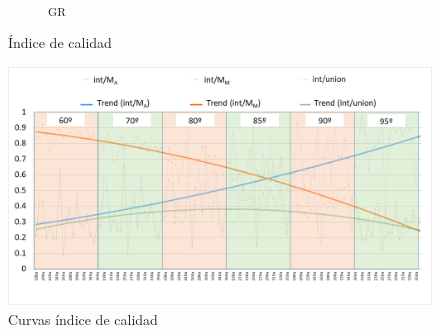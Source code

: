 \begin{figure}[h!]
\begin{subfigure}[b]{\textwidth}
         \caption{\textpsi \textsubscript{GR}}
         \label{psiGR}
     \end{subfigure}
        \caption{Índice de calidad}
        \label{quality_index}
\end{figure}

\begin{figure} [h!]
         \centering
         \includegraphics[width=\textwidth]{Imagenes/grafico.png}
         \hfill
         \caption{Curvas índice de calidad}
        \label{curvas_QI}
\end{figure}

